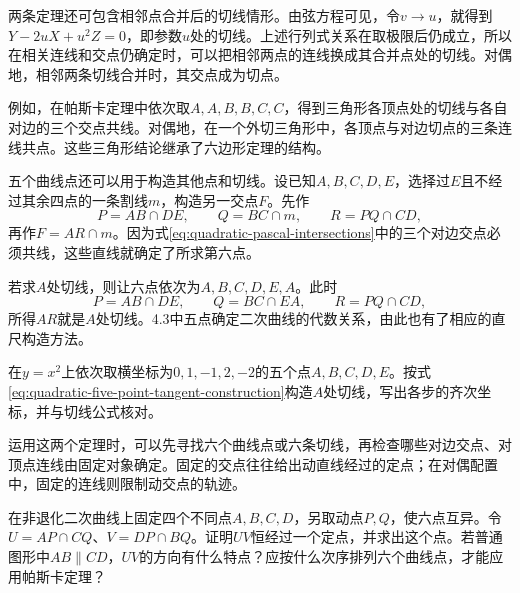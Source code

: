 两条定理还可包含相邻点合并后的切线情形。由弦方程可见，令\(v\to u\)，就得到\(Y-2uX+u^2Z=0\)，即参数\(u\)处的切线。上述行列式关系在取极限后仍成立，所以在相关连线和交点仍确定时，可以把相邻两点的连线换成其合并点处的切线。对偶地，相邻两条切线合并时，其交点成为切点。

例如，在帕斯卡定理中依次取\(A,A,B,B,C,C\)，得到三角形各顶点处的切线与各自对边的三个交点共线。对偶地，在一个外切三角形中，各顶点与对边切点的三条连线共点。这些三角形结论继承了六边形定理的结构。

五个曲线点还可以用于构造其他点和切线。设已知\(A,B,C,D,E\)，选择过\(E\)且不经过其余四点的一条割线\(m\)，构造另一交点\(F\)。先作
\begin{equation*}
 P=AB\cap DE,\qquad Q=BC\cap m,\qquad R=PQ\cap CD,
\end{equation*}
再作\(F=AR\cap m\)。因为式\eqref{eq:quadratic-pascal-intersections}中的三个对边交点必须共线，这些直线就确定了所求第六点。

若求\(A\)处切线，则让六点依次为\(A,B,C,D,E,A\)。此时
\begin{equation}\label{eq:quadratic-five-point-tangent-construction}
 P=AB\cap DE,\qquad Q=BC\cap EA,\qquad R=PQ\cap CD,
\end{equation}
所得\(AR\)就是\(A\)处切线。4.3中五点确定二次曲线的代数关系，由此也有了相应的直尺构造方法。

\par\addvspace{6pt}
\noindent\begin{minipage}{\linewidth}
\begin{example}
在\(y=x^2\)上依次取横坐标为\(0,1,-1,2,-2\)的五个点\(A,B,C,D,E\)。按式\eqref{eq:quadratic-five-point-tangent-construction}构造\(A\)处切线，写出各步的齐次坐标，并与切线公式核对。
\end{example}
\end{minipage}\par\addvspace{6pt}

\newpage
运用这两个定理时，可以先寻找六个曲线点或六条切线，再检查哪些对边交点、对顶点连线由固定对象确定。固定的交点往往给出动直线经过的定点；在对偶配置中，固定的连线则限制动交点的轨迹。

\par\addvspace{6pt}
\noindent\begin{minipage}{\linewidth}
\begin{example}\label{ex:quadratic-moving-pascal}
在非退化二次曲线上固定四个不同点\(A,B,C,D\)，另取动点\(P,Q\)，使六点互异。令\(U=AP\cap CQ\)、\(V=DP\cap BQ\)。证明\(UV\)恒经过一个定点，并求出这个点。若普通图形中\(AB\parallel CD\)，\(UV\)的方向有什么特点？应按什么次序排列六个曲线点，才能应用帕斯卡定理？
\end{example}
\end{minipage}\par\addvspace{6pt}

